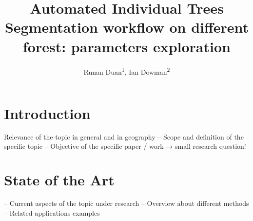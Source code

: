 \documentclass{isprs} %
\begin{document}
\title{Automated Individual Trees Segmentation workflow on different forest: parameters exploration}
\date{}

\author{
 Runan Duan\textsuperscript{1}, Ian Dowman\textsuperscript{2}}

\address{
	\textsuperscript{1 }Institute of Geography, Heidelberg University, Im Neuenheimer Feld 368, Heidelberg, 69120, Baden-W ̈urttemberg, Germany - (runan.duan)@stud.heidelberg-de\\
}



\maketitle

\section{Introduction}
 Relevance of the topic in general and in geography
 – Scope and definition of the specific topic
 – Objective of the specific paper / work → small research question!














\sloppy

\section{State of the Art}
– Current aspects of the topic under research
– Overview about different methods
– Related applications examples

\subsection{}

\subsection{}
\end{document}
